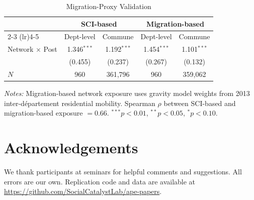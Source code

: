 \documentclass[12pt]{article}
\newcommand{\dept}{d\'{e}partement}
\begin{document}
\begin{table}[H]
\centering
\caption{Migration-Proxy Validation}
\label{tab:migration}
\begin{threeparttable}
\begin{tabular}{@{}lcccc@{}}
\toprule
 & \multicolumn{2}{c}{SCI-based} & \multicolumn{2}{c}{Migration-based} \\
 \cmidrule(lr){2-3} \cmidrule(lr){4-5}
 & Dept-level & Commune & Dept-level & Commune \\
\midrule
Network $\times$ Post & 1.346$^{***}$ & 1.192$^{***}$ & 1.454$^{***}$ & 1.101$^{***}$ \\
 & (0.455) & (0.237) & (0.267) & (0.132) \\[3pt]
\midrule
$N$ & 960 & 361,796 & 960 & 359,062 \\
\bottomrule
\end{tabular}
\begin{tablenotes}
\small
\item \textit{Notes:} Migration-based network exposure uses gravity model weights from 2013 inter-\dept{} residential mobility. Spearman $\rho$ between SCI-based and migration-based exposure $= 0.66$. $^{***}p<0.01$, $^{**}p<0.05$, $^{*}p<0.10$.
\end{tablenotes}
\end{threeparttable}
\end{table}

\section*{Acknowledgements}
We thank participants at seminars for helpful comments and suggestions. All errors are our own. Replication code and data are available at \url{https://github.com/SocialCatalystLab/ape-papers}.
\end{document}
